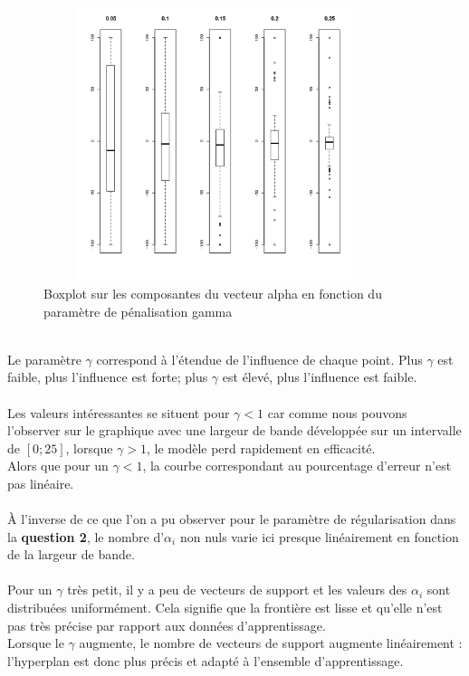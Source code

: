 \documentclass[a4paper, 10pt]{article}
\begin{document}
\begin{figure}[h!]
	\centering
  \includegraphics[height = 8cm, width = 10cm]{plots/ex4_q3_boxplot_alpha_.png}
  \caption{Boxplot sur les composantes du vecteur alpha en fonction du paramètre de pénalisation gamma}
\end{figure}\\
Le paramètre $\gamma$ correspond à l’étendue de l’influence de chaque point.
Plus $\gamma$ est faible, plus l’influence est forte; plus $\gamma$ est élevé, plus l’influence est faible.\\ \\
Les valeurs intéressantes se situent pour $\gamma < 1$ car comme nous pouvons l'observer sur le graphique avec une largeur de bande développée sur un intervalle de $[0;25]$, lorsque $\gamma > 1$, le modèle perd rapidement en efficacité.\\
Alors que pour un $\gamma < 1$, la courbe correspondant au pourcentage d’erreur n’est pas linéaire.\\ \\
À l’inverse de ce que l’on a pu observer pour le paramètre de régularisation dans la \textbf{question 2}, le nombre d’$\alpha_{i}$ non nuls varie ici presque linéairement en fonction de la largeur de bande.\\ \\
Pour un $\gamma$ très petit, il y a peu de vecteurs de support et les valeurs des $\alpha_{i}$ sont distribuées uniformément.
Cela signifie que la frontière est lisse et qu'elle n’est pas très précise par rapport aux données d’apprentissage.\\
Lorsque le $\gamma$ augmente, le nombre de vecteurs de support augmente linéairement : l’hyperplan est donc plus précis et adapté à l’ensemble d’apprentissage.\\
\end{document}
